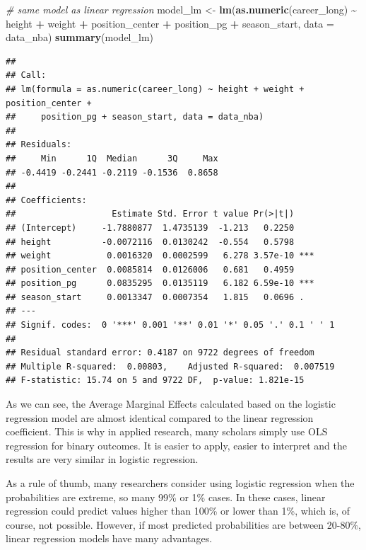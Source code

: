 \documentclass[
]{book}
\newenvironment{Shaded}{\begin{snugshade}}{\end{snugshade}}
\newcommand{\AttributeTok}[1]{\textcolor[rgb]{0.13,0.29,0.53}{#1}}
\newcommand{\CommentTok}[1]{\textcolor[rgb]{0.56,0.35,0.01}{\textit{#1}}}
\newcommand{\FunctionTok}[1]{\textcolor[rgb]{0.13,0.29,0.53}{\textbf{#1}}}
\newcommand{\NormalTok}[1]{#1}
\newcommand{\OtherTok}[1]{\textcolor[rgb]{0.56,0.35,0.01}{#1}}
\newcommand{\SpecialCharTok}[1]{\textcolor[rgb]{0.81,0.36,0.00}{\textbf{#1}}}
\begin{document}
\begin{Shaded}
\begin{Highlighting}[]
\CommentTok{\# same model as linear regression}
\NormalTok{model\_lm }\OtherTok{\textless{}{-}} \FunctionTok{lm}\NormalTok{(}\FunctionTok{as.numeric}\NormalTok{(career\_long) }\SpecialCharTok{\textasciitilde{}}\NormalTok{ height }\SpecialCharTok{+}\NormalTok{ weight }\SpecialCharTok{+}\NormalTok{ position\_center }\SpecialCharTok{+}\NormalTok{ position\_pg }\SpecialCharTok{+}
\NormalTok{                      season\_start,}
                    \AttributeTok{data =}\NormalTok{ data\_nba)}
\FunctionTok{summary}\NormalTok{(model\_lm)}
\end{Highlighting}
\end{Shaded}

\begin{verbatim}
## 
## Call:
## lm(formula = as.numeric(career_long) ~ height + weight + position_center + 
##     position_pg + season_start, data = data_nba)
## 
## Residuals:
##     Min      1Q  Median      3Q     Max 
## -0.4419 -0.2441 -0.2119 -0.1536  0.8658 
## 
## Coefficients:
##                   Estimate Std. Error t value Pr(>|t|)    
## (Intercept)     -1.7880877  1.4735139  -1.213   0.2250    
## height          -0.0072116  0.0130242  -0.554   0.5798    
## weight           0.0016320  0.0002599   6.278 3.57e-10 ***
## position_center  0.0085814  0.0126006   0.681   0.4959    
## position_pg      0.0835295  0.0135119   6.182 6.59e-10 ***
## season_start     0.0013347  0.0007354   1.815   0.0696 .  
## ---
## Signif. codes:  0 '***' 0.001 '**' 0.01 '*' 0.05 '.' 0.1 ' ' 1
## 
## Residual standard error: 0.4187 on 9722 degrees of freedom
## Multiple R-squared:  0.00803,    Adjusted R-squared:  0.007519 
## F-statistic: 15.74 on 5 and 9722 DF,  p-value: 1.821e-15
\end{verbatim}

As we can see, the Average Marginal Effects calculated based on the logistic
regression model are almost identical compared to the linear regression coefficient.
This is why in applied research, many scholars simply use OLS regression for binary
outcomes. It is easier to apply, easier to interpret and the results are very similar
in logistic regression.

As a rule of thumb, many researchers consider using logistic regression when
the probabilities are extreme, so many 99\% or 1\% cases. In these cases, linear
regression could predict values higher than 100\% or lower than 1\%, which is, of course,
not possible. However, if most predicted probabilities are between 20-80\%, linear
regression models have many advantages.
\end{document}
